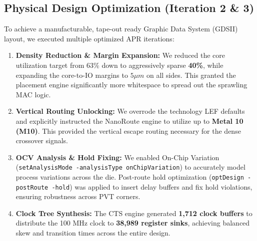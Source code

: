 \subsection{Physical Design Optimization (Iteration 2 \& 3)}
To achieve a manufacturable, tape-out ready Graphic Data System (GDSII) layout, we executed multiple optimized APR iterations:
\begin{enumerate}
    \item \textbf{Density Reduction \& Margin Expansion:} We reduced the core utilization target from 63\% down to aggressively sparse \textbf{40\%}, while expanding the core-to-IO margins to $5\mu m$ on all sides. This granted the placement engine significantly more whitespace to spread out the sprawling MAC logic.
    \item \textbf{Vertical Routing Unlocking:} We overrode the technology LEF defaults and explicitly instructed the NanoRoute engine to utilize up to \textbf{Metal 10 (M10)}. This provided the vertical escape routing necessary for the dense crossover signals.
    \item \textbf{OCV Analysis \& Hold Fixing:} We enabled On-Chip Variation (\texttt{setAnalysisMode -analysisType onChipVariation}) to accurately model process variations across the die. Post-route hold optimization (\texttt{optDesign -postRoute -hold}) was applied to insert delay buffers and fix hold violations, ensuring robustness across PVT corners.
    \item \textbf{Clock Tree Synthesis:} The CTS engine generated \textbf{1,712 clock buffers} to distribute the 100 MHz clock to \textbf{38,989 register sinks}, achieving balanced skew and transition times across the entire design.
\end{enumerate}

